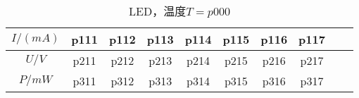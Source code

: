 \newpage
\begin{table}[H]
    \centering
    \begin{tabular}{|c|c|c|c|c|c|c|c|c|c|}
        \hline
        $I/(\si{mA})$ & p111 & p112 & p113 & p114 & p115 & p116 & p117 \\\hline
        $U / \si{V}$  & p211 & p212 & p213 & p214 & p215 & p216 & p217 \\\hline
        $P / \si{mW}$ & p311 & p312 & p313 & p314 & p315 & p316 & p317 \\\hline
    \end{tabular}
    \caption{LED，温度$T=p000$}
\end{table}
